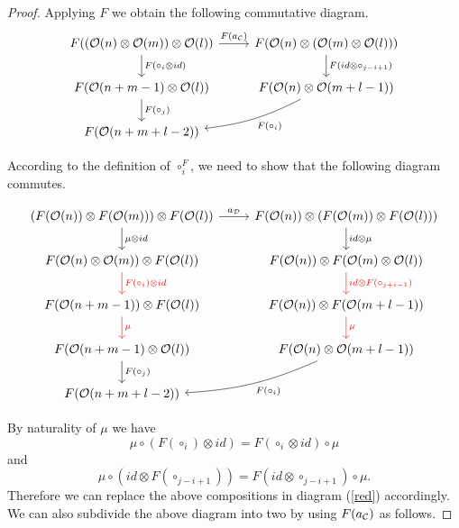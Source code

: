 \documentclass[Thesis.tex]{subfiles}
\begin{document}
\begin{proof}
 Applying $F$ we obtain the following commutative diagram.
  \begin{equation}\label{assaux}
\begin{tikzcd}
F((\OO(n)\otimes \OO(m))\otimes \OO(l)) \arrow[r, "F(a_\CC)"]\arrow[d, "F(\circ_i\otimes id)"] & F(\OO(n)\otimes (\OO(m)\otimes\OO(l)))\arrow[d, "F(id\otimes\circ_{j-i+1})"]\\
F(\OO(n+m-1)\otimes\OO(l))\arrow[d, "F(\circ_j)"] & F(\OO(n)\otimes\OO(m+l-1))\arrow[dl, bend left = 10, "F(\circ_i)"]\\
F(\OO(n+m+l-2)) & 
\end{tikzcd} 
   \end{equation}
   
   According to the definition of $\circ_i^F$, we need to show that the following diagram commutes. 
   
   \begin{equation}\label{red}  
\begin{tikzcd}
(F(\OO(n))\otimes F(\OO(m)))\otimes F(\OO(l)) \arrow[r, "a_\DD"] \arrow[d, "\mu\otimes id"] & F(\OO(n))\otimes (F(\OO(m))\otimes F(\OO(l)))\arrow[d, "id\otimes \mu"]\\
F(\OO(n)\otimes \OO(m))\otimes F(\OO(l))\arrow[d, red, "F(\circ_i)\otimes id"] & F(\OO(n))\otimes F(\OO(m)\otimes\OO(l))\arrow[d, red, "id\otimes F(\circ_{j+i-1})"]\\
F(\OO(n+m-1))\otimes F(\OO(l))\arrow[d, red, "\mu"] & F(\OO(n))\otimes F(\OO(m+l-1))\arrow[d, red, "\mu"]\\
F(\OO(n+m-1)\otimes\OO(l))\arrow[d, "F(\circ_j)"] & F(\OO(n)\otimes\OO(m+l-1))\arrow[dl, bend left = 10, "F(\circ_i)"]\\
F(\OO(n+m+l-2)) & 
\end{tikzcd}   
   \end{equation}
   
   By naturality of $\mu$ we have 
   \begin{equation}\label{naturality}
   \mu\circ (F(\circ_i)\otimes id)= F( \circ_i \otimes id)\circ \mu 
   \end{equation} and \[\mu\circ (id \otimes F(\circ_{j-i+1}))= F(id\otimes \circ_{j-i+1})\circ \mu.\]
    Therefore we can replace the above compositions in diagram (\ref{red}) accordingly. We can also subdivide the above diagram into two by using $F(a_{\mathcal C})$ as follows.
   

\end{proof}
\end{document}
